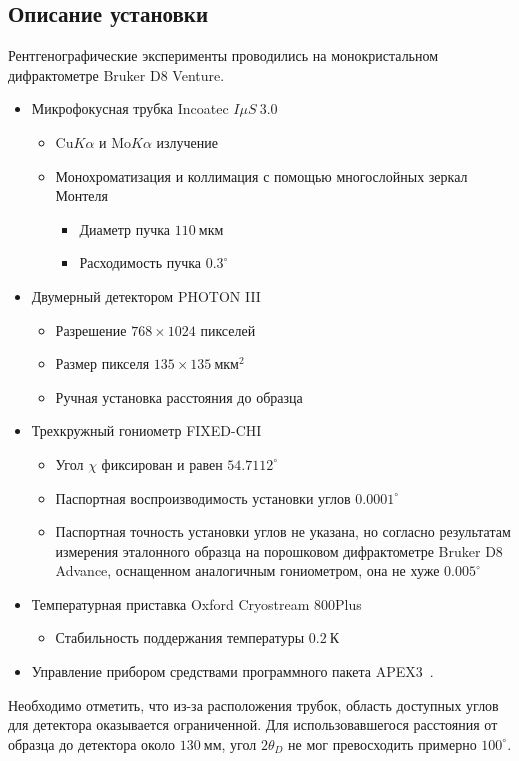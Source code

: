 \documentclass[a4paper,14pt]{extarticle}
\newcommand{\unit}[1]{ \ \text{#1}}
\newcommand{\degree}{^\circ}
\newcounter{x}
\begin{document}
\subsection{Описание установки}
Рентгенографические эксперименты проводились на монокристальном дифрактометре Bruker D8 Venture.
\begin{itemize}
    \item Микрофокусная трубка Incoatec $I \mu S \ 3.0$
    \begin{itemize}
        \item $\text{Cu} K\alpha$ и $\text{Mo} K\alpha$ излучение
        \item Монохроматизация и коллимация с помощью многослойных зеркал Монтеля
        \begin{itemize}
            \item Диаметр пучка $110\unit{мкм}$
            \item Расходимость пучка $0.3\degree$
        \end{itemize}
    \end{itemize}
    \item Двумерный детектором PHOTON III
    \begin{itemize}
        \item Разрешение $768 \times 1024$ пикселей
        \item Размер пикселя $135 \times 135\unit{мкм}^2$
        \item Ручная установка расстояния до образца
    \end{itemize}
    \item Трехкружный гониометр FIXED-CHI
    \begin{itemize}
        \item Угол $\chi$ фиксирован и равен $54.7112\degree$
        \item Паспортная воспроизводимость установки углов $0.0001\degree$
        \item Паспортная точность установки углов не указана, но согласно результатам измерения эталонного образца на порошковом дифрактометре Bruker D8 Advance, оснащенном аналогичным гониометром, она не хуже $0.005\degree$
    \end{itemize}
    \item Температурная приставка Oxford Cryostream 800Plus
    \begin{itemize}
            \item Стабильность поддержания температуры $0.2\unit{К}$
    \end{itemize}
    \item Управление прибором средствами программного пакета APEX3~\cite{Bruker:2019}.
\end{itemize}
Необходимо отметить, что из-за расположения трубок, область доступных углов для детектора оказывается ограниченной.
Для использовавшегося расстояния от образца до детектора около $130\unit{мм}$, угол $2\theta_D$ не мог превосходить примерно $100\degree$.
\end{document}
